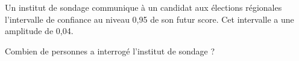 
Un institut de sondage communique à un candidat aux élections régionales l'intervalle de confiance au niveau 0,95 de son futur score. Cet intervalle a une amplitude de 0,04.

Combien de personnes a interrogé l'institut de sondage ?